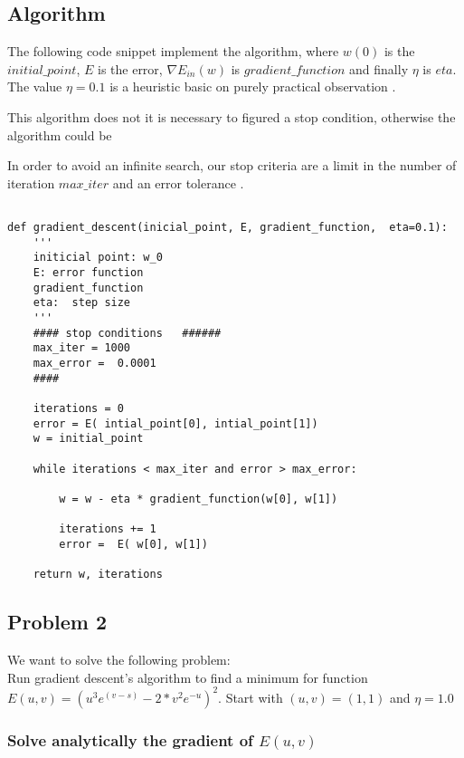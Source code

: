 \subsection{Algorithm}

The following code snippet implement the algorithm, where $w(0)$ is the $initial\_point$, $E$ is the error, $\nabla E_{in}(w)$ is $gradient\_function$ and
finally $\eta$ is $eta.$ The value $\eta = 0.1$ is a heuristic basic on purely practical observation \cite{LFD}.

This algorithm does not  it is necessary to figured a stop condition, otherwise the algorithm could be

In order to avoid an infinite search, our stop criteria are a limit in the number of iteration $max\_iter$ and an error tolerance . 

\begin{verbatim}

def gradient_descent(inicial_point, E, gradient_function,  eta=0.1):
    '''
    initicial point: w_0 
    E: error function 
    gradient_function
    eta:  step size 
    '''
    #### stop conditions   ######
    max_iter = 1000
    max_error =  0.0001
    ####

    iterations = 0
    error = E( intial_point[0], intial_point[1])
    w = initial_point

    while iterations < max_iter and error > max_error:

        w = w - eta * gradient_function(w[0], w[1])

        iterations += 1
        error =  E( w[0], w[1])
    
    return w, iterations   
\end{verbatim}

\subsection{Problem 2 }

We want to solve the following problem: \\

Run gradient descent's algorithm to find a minimum for
function $E(u,v) = (u^3 e^{(v-s)} - 2* v^2 e^{-u})^2.$
Start with $(u,v)=(1,1)$ and $\eta = 1.0$


\subsubsection{Solve analytically the gradient of $E(u,v)$}



